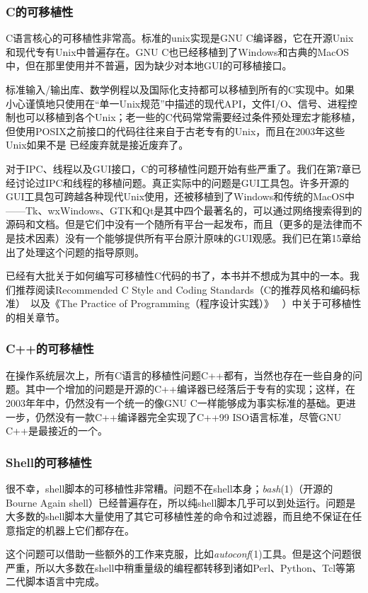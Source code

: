 \documentclass[12pt,oneside]{ctexbook}
\begin{document}
\begin{common-format}
\subsubsection{C的可移植性}
C语言核心的可移植性非常高。标准的unix实现是GNU C编译器，它在开源Unix和现代专有Unix中普遍存在。GNU C也已经移植到了Windows和古典的MacOS中，但在那里使用并不普遍，因为缺少对本地GUI的可移植接口。

标准输入/输出库、数学例程以及国际化支持都可以移植到所有的C实现中。如果小心谨慎地只使用在“单一Unix规范”中描述的现代API，文件I/O、信号、进程控制也可以移植到各个Unix；老一些的C代码常常需要经过条件预处理宏才能移植，但使用POSIX之前接口的代码往往来自于古老专有的Unix，而且在2003年这些Unix如果不是
已经废弃就是接近废弃了。

对于IPC、线程以及GUI接口，C的可移植性问题开始有些严重了。我们在第7章已经讨论过IPC和线程的移植问题。真正实际中的问题是GUI工具包。许多开源的GUI工具包可跨越各种现代Unix使用，还被移植到了Windows和传统的MacOS中——Tk、wxWindows、GTK和Qt是其中四个最著名的，可以通过网络搜索得到的源码和文档。但是它们中没有一个随所有平台一起发布，而且（更多的是法律而不是技术因素）没有一个能够提供所有平台原汁原味的GUI观感。我们已在第15章给出了处理这个问题的指导原则。

已经有大批关于如何编写可移植性C代码的书了，本书并不想成为其中的一本。我们推荐阅读Recommended C Style and Coding Standards（C的推荐风格和编码标准）~\cite{Cannon}以及《The Practice of Programming（程序设计实践）》 ~\cite{Kernighan-Pike99}）中关于可移植性的相关章节。

\subsubsection{C++的可移植性}
在操作系统层次上，所有C语言的移植性问题C++都有，当然也存在一些自身的问题。其中一个增加的问题是开源的C++编译器已经落后于专有的实现；这样，在2003年年中，仍然没有一个统一的像GNU C一样能够成为事实标准的基础。更进一步，仍然没有一款C++编译器完全实现了C++99 ISO语言标准，尽管GNU C++是最接近的一个。

\subsubsection{Shell的可移植性}
很不幸，shell脚本的可移植性非常糟。问题不在shell本身；\textit{bash}(1)（开源的Bourne Again shell）已经普遍存在，所以纯shell脚本几乎可以到处运行。问题是大多数的shell脚本大量使用了其它可移植性差的命令和过滤器，而且绝不保证在任意指定的机器上它们都存在。

这个问题可以借助一些额外的工作来克服，比如\textit{autoconf}(1)工具。但是这个问题很严重，所以大多数在shell中稍重量级的编程都转移到诸如Perl、Python、Tcl等第二代脚本语言中完成。


\end{common-format}
\end{document}
